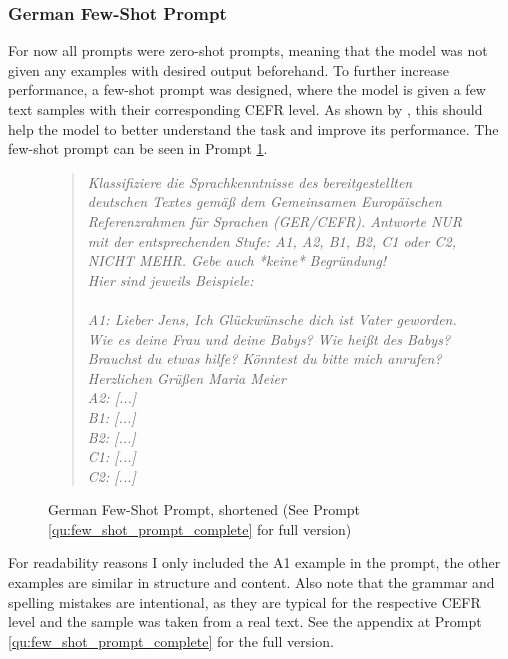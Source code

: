 \subsubsection*{German Few-Shot Prompt}
\label{ss:few_shot_prompt}
For now all prompts were zero-shot prompts, meaning that the model was not given any examples with desired output beforehand. To further increase performance, a few-shot prompt was designed, where the model is given a few text samples with their corresponding CEFR level. 
As shown by \cite{Brown2020}, this should help the model to better understand the task and improve its performance. The few-shot prompt can be seen in Prompt \ref{qu:few_shot_prompt}.

\captionsetup{labelformat=prompt}
\begin{figure}[h]
    \begin{quotation}
        \textit{Klassifiziere die Sprachkenntnisse des bereitgestellten deutschen Textes gemäß dem Gemeinsamen Europäischen Referenzrahmen für Sprachen (GER/CEFR). Antworte NUR mit der entsprechenden Stufe: A1, A2, B1, B2, C1 oder C2, NICHT MEHR. Gebe auch *keine* Begründung! \\
        Hier sind jeweils Beispiele: \\ \\
        A1: Lieber Jens, Ich Glückwünsche dich ist Vater geworden. Wie es deine Frau und deine Babys? Wie heißt des Babys? Brauchst du etwas hilfe? Könntest du bitte mich anrufen? Herzlichen Grüßen Maria Meier \\
        A2: [...] \\
        B1: [...] \\
        B2: [...] \\
        C1: [...] \\
        C2: [...]}
    \end{quotation}
    \caption{German Few-Shot Prompt, shortened (See Prompt \ref{qu:few_shot_prompt_complete} for full version)}
    \label{qu:few_shot_prompt}
\end{figure}
\captionsetup{labelformat=default}

For readability reasons I only included the A1 example in the prompt, the other examples are similar in structure and content. Also note that the grammar and spelling mistakes are intentional, as they are typical for the respective CEFR level and the sample was taken from a real text. See the appendix at Prompt \ref{qu:few_shot_prompt_complete} for the full version.

